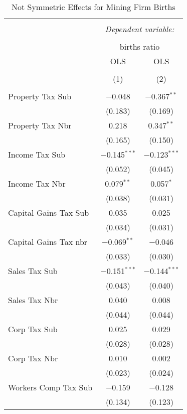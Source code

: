 
\begin{table}[!htbp] \centering 
  \caption{Not Symmetric Effects for  Mining Firm Births} 
  \label{} 
\begin{tabular}{@{\extracolsep{5pt}}lcc} 
\\[-1.8ex]\hline 
\hline \\[-1.8ex] 
 & \multicolumn{2}{c}{\textit{Dependent variable:}} \\ 
\cline{2-3} 
\\[-1.8ex] & \multicolumn{2}{c}{births ratio} \\ 
 & OLS & OLS \\ 
\\[-1.8ex] & (1) & (2)\\ 
\hline \\[-1.8ex] 
 Property Tax Sub & $-$0.048 & $-$0.367$^{**}$ \\ 
  & (0.183) & (0.169) \\ 
  Property Tax Nbr & 0.218 & 0.347$^{**}$ \\ 
  & (0.165) & (0.150) \\ 
  Income Tax Sub & $-$0.145$^{***}$ & $-$0.123$^{***}$ \\ 
  & (0.052) & (0.045) \\ 
  Income Tax Nbr & 0.079$^{**}$ & 0.057$^{*}$ \\ 
  & (0.038) & (0.031) \\ 
  Capital Gains Tax Sub & 0.035 & 0.025 \\ 
  & (0.034) & (0.031) \\ 
  Capital Gains Tax nbr & $-$0.069$^{**}$ & $-$0.046 \\ 
  & (0.033) & (0.030) \\ 
  Sales Tax Sub & $-$0.151$^{***}$ & $-$0.144$^{***}$ \\ 
  & (0.043) & (0.040) \\ 
  Sales Tax Nbr & 0.040 & 0.008 \\ 
  & (0.044) & (0.044) \\ 
  Corp Tax Sub & 0.025 & 0.029 \\ 
  & (0.028) & (0.028) \\ 
  Corp Tax Nbr & 0.010 & 0.002 \\ 
  & (0.023) & (0.024) \\ 
  Workers Comp Tax Sub & $-$0.159 & $-$0.128 \\ 
  & (0.134) & (0.123) \\ 

\end{tabular}
\end{table}
